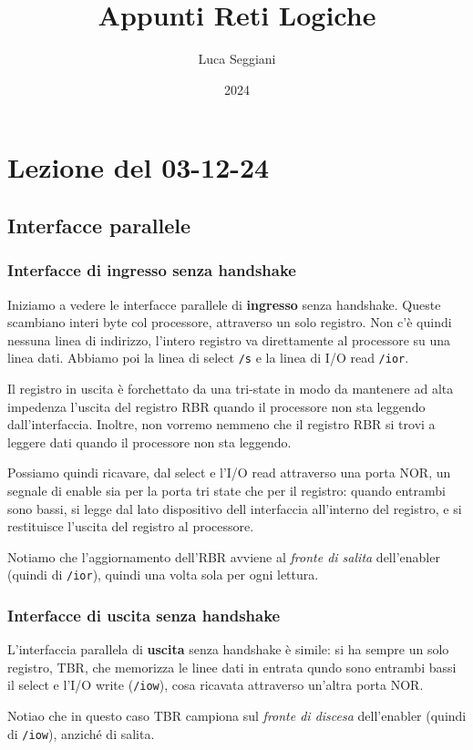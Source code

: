 \documentclass[a4paper,11pt]{article}
\title{Appunti Reti Logiche}
\author{Luca Seggiani}
\date{2024}
\begin{document}
\section{Lezione del 03-12-24}

\thispagestyle{empty}
\pagestyle{fancy}

\subsection{Interfacce parallele}
\subsubsection{Interfacce di ingresso senza handshake}
Iniziamo a vedere le interfacce parallele di \textbf{ingresso} senza handshake.
Queste scambiano interi byte col processore, attraverso un solo registro.
Non c'è quindi nessuna linea di indirizzo, l'intero registro va direttamente al processore su una linea dati.
Abbiamo poi la linea di select \lstinline|/s| e la linea di I/O read \lstinline|/ior|.

Il registro in uscita è forchettato da una tri-state in modo da mantenere ad alta impedenza l'uscita del registro RBR quando il processore non sta leggendo dall'interfaccia. 
Inoltre, non vorremo nemmeno che il registro RBR si trovi a leggere dati quando il processore non sta leggendo.

Possiamo quindi ricavare, dal select e l'I/O read attraverso una porta NOR, un segnale di enable sia per la porta tri state che per il registro: quando entrambi sono bassi, si legge dal lato dispositivo dell interfaccia all'interno del registro, e si restituisce l'uscita del registro al processore.

Notiamo che l'aggiornamento dell'RBR avviene al \textit{fronte di salita} dell'enabler (quindi di \lstinline|/ior|), quindi una volta sola per ogni lettura.

\subsubsection{Interfacce di uscita senza handshake}
L'interfaccia parallela di \textbf{uscita} senza handshake è simile: si ha sempre un solo registro, TBR, che memorizza le linee dati in entrata qundo sono entrambi bassi il select e l'I/O write (\lstinline|/iow|), cosa ricavata attraverso un'altra porta NOR.

Notiao che in questo caso TBR campiona sul \textit{fronte di discesa} dell'enabler (quindi di \lstinline|/iow|), anziché di salita.
\end{document}
